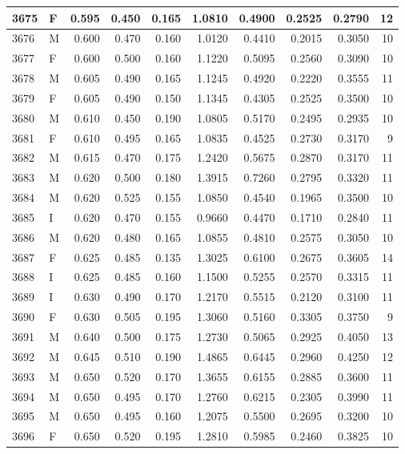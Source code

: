 \documentclass[9pt,twocolumn,twoside,]{pnas-new}
\begin{document}
\begin{tabular}{l|l|r|r|r|r|r|r|r|r}
\hline
3675 & F & 0.595 & 0.450 & 0.165 & 1.0810 & 0.4900 & 0.2525 & 0.2790 & 12\\
\hline
3676 & M & 0.600 & 0.470 & 0.160 & 1.0120 & 0.4410 & 0.2015 & 0.3050 & 10\\
\hline
3677 & F & 0.600 & 0.500 & 0.160 & 1.1220 & 0.5095 & 0.2560 & 0.3090 & 10\\
\hline
3678 & M & 0.605 & 0.490 & 0.165 & 1.1245 & 0.4920 & 0.2220 & 0.3555 & 11\\
\hline
3679 & F & 0.605 & 0.490 & 0.150 & 1.1345 & 0.4305 & 0.2525 & 0.3500 & 10\\
\hline
3680 & M & 0.610 & 0.450 & 0.190 & 1.0805 & 0.5170 & 0.2495 & 0.2935 & 10\\
\hline
3681 & F & 0.610 & 0.495 & 0.165 & 1.0835 & 0.4525 & 0.2730 & 0.3170 & 9\\
\hline
3682 & M & 0.615 & 0.470 & 0.175 & 1.2420 & 0.5675 & 0.2870 & 0.3170 & 11\\
\hline
3683 & M & 0.620 & 0.500 & 0.180 & 1.3915 & 0.7260 & 0.2795 & 0.3320 & 11\\
\hline
3684 & M & 0.620 & 0.525 & 0.155 & 1.0850 & 0.4540 & 0.1965 & 0.3500 & 10\\
\hline
3685 & I & 0.620 & 0.470 & 0.155 & 0.9660 & 0.4470 & 0.1710 & 0.2840 & 11\\
\hline
3686 & M & 0.620 & 0.480 & 0.165 & 1.0855 & 0.4810 & 0.2575 & 0.3050 & 10\\
\hline
3687 & F & 0.625 & 0.485 & 0.135 & 1.3025 & 0.6100 & 0.2675 & 0.3605 & 14\\
\hline
3688 & I & 0.625 & 0.485 & 0.160 & 1.1500 & 0.5255 & 0.2570 & 0.3315 & 11\\
\hline
3689 & I & 0.630 & 0.490 & 0.170 & 1.2170 & 0.5515 & 0.2120 & 0.3100 & 11\\
\hline
3690 & F & 0.630 & 0.505 & 0.195 & 1.3060 & 0.5160 & 0.3305 & 0.3750 & 9\\
\hline
3691 & M & 0.640 & 0.500 & 0.175 & 1.2730 & 0.5065 & 0.2925 & 0.4050 & 13\\
\hline
3692 & M & 0.645 & 0.510 & 0.190 & 1.4865 & 0.6445 & 0.2960 & 0.4250 & 12\\
\hline
3693 & M & 0.650 & 0.520 & 0.170 & 1.3655 & 0.6155 & 0.2885 & 0.3600 & 11\\
\hline
3694 & M & 0.650 & 0.495 & 0.170 & 1.2760 & 0.6215 & 0.2305 & 0.3990 & 11\\
\hline
3695 & M & 0.650 & 0.495 & 0.160 & 1.2075 & 0.5500 & 0.2695 & 0.3200 & 10\\
\hline
3696 & F & 0.650 & 0.520 & 0.195 & 1.2810 & 0.5985 & 0.2460 & 0.3825 & 10\\

\end{tabular}
\end{document}
